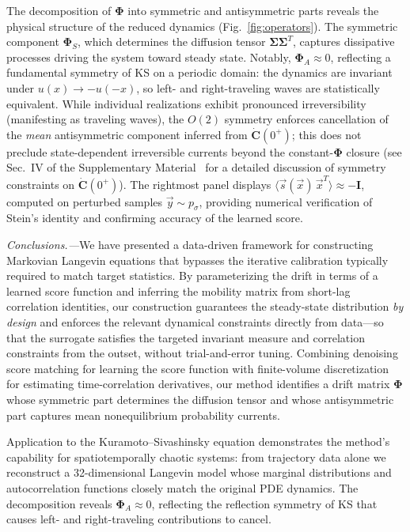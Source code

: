\documentclass[%
  prl,
  reprint,
  amsmath,
  amssymb,
  aps
]{revtex4-2}
\newcommand{\vvec}[1]{\vec{#1}}
\begin{document}
The decomposition of $\bm{\Phi}$ into symmetric and antisymmetric parts reveals the physical structure of the reduced dynamics (Fig.~\ref{fig:operators}). The symmetric component $\bm{\Phi}_S$, which determines the diffusion tensor $\bm{\Sigma}\bm{\Sigma}^T$, captures dissipative processes driving the system toward steady state. Notably, $\bm{\Phi}_A \approx 0$, reflecting a fundamental symmetry of KS on a periodic domain: the dynamics are invariant under $u(x) \to -u(-x)$, so left- and right-traveling waves are statistically equivalent. While individual realizations exhibit pronounced irreversibility (manifesting as traveling waves), the $O(2)$ symmetry enforces cancellation of the \emph{mean} antisymmetric component inferred from $\dot{\bm{C}}(0^+)$; this does not preclude state-dependent irreversible currents beyond the constant-$\bm{\Phi}$ closure (see Sec.~IV of the Supplementary Material~\cite{SM} for a detailed discussion of symmetry constraints on $\dot{\bm{C}}(0^+)$). The rightmost panel displays $\langle \vvec{s}(\vvec{x})\,\vvec{x}^T \rangle \approx -\bm{I}$, computed on perturbed samples $\vvec{y}\sim p_\sigma$, providing numerical verification of Stein's identity and confirming accuracy of the learned score.

\textit{Conclusions.---}We have presented a data-driven framework for constructing Markovian Langevin equations that bypasses the iterative calibration typically required to match target statistics. By parameterizing the drift in terms of a learned score function and inferring the mobility matrix from short-lag correlation identities, our construction guarantees the steady-state distribution \emph{by design} and enforces the relevant dynamical constraints directly from data---so that the surrogate satisfies the targeted invariant measure and correlation constraints from the outset, without trial-and-error tuning. Combining denoising score matching for learning the score function with finite-volume discretization for estimating time-correlation derivatives, our method identifies a drift matrix $\bm{\Phi}$ whose symmetric part determines the diffusion tensor and whose antisymmetric part captures mean nonequilibrium probability currents.

Application to the Kuramoto--Sivashinsky equation demonstrates the method's capability for spatiotemporally chaotic systems: from trajectory data alone we reconstruct a 32-dimensional Langevin model whose marginal distributions and autocorrelation functions closely match the original PDE dynamics. The decomposition reveals $\bm{\Phi}_A \approx 0$, reflecting the reflection symmetry of KS that causes left- and right-traveling contributions to cancel.
\end{document}
